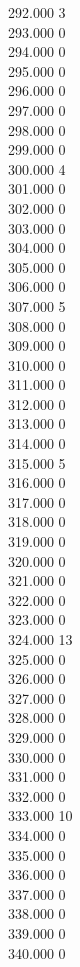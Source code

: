 { 292.000	3 \\
 293.000	0 \\
 294.000	0 \\
 295.000	0 \\
 296.000	0 \\
 297.000	0 \\
 298.000	0 \\
 299.000	0 \\
 300.000	4 \\
 301.000	0 \\
 302.000	0 \\
 303.000	0 \\
 304.000	0 \\
 305.000	0 \\
 306.000	0 \\
 307.000	5 \\
 308.000	0 \\
 309.000	0 \\
 310.000	0 \\
 311.000	0 \\
 312.000	0 \\
 313.000	0 \\
 314.000	0 \\
 315.000	5 \\
 316.000	0 \\
 317.000	0 \\
 318.000	0 \\
 319.000	0 \\
 320.000	0 \\
 321.000	0 \\
 322.000	0 \\
 323.000	0 \\
 324.000	13 \\
 325.000	0 \\
 326.000	0 \\
 327.000	0 \\
 328.000	0 \\
 329.000	0 \\
 330.000	0 \\
 331.000	0 \\
 332.000	0 \\
 333.000	10 \\
 334.000	0 \\
 335.000	0 \\
 336.000	0 \\
 337.000	0 \\
 338.000	0 \\
 339.000	0 \\
 340.000	0 \\
}
